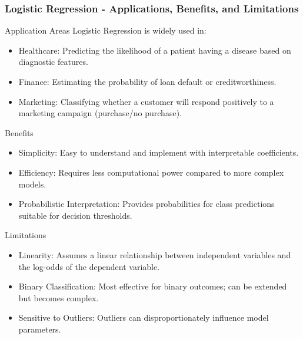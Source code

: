 \documentclass[aspectratio=169]{beamer}
\begin{document}
\begin{frame}[fragile]
    \frametitle{Logistic Regression - Applications, Benefits, and Limitations}
    \begin{block}{Application Areas}
        Logistic Regression is widely used in:
        \begin{itemize}
            \item Healthcare: Predicting the likelihood of a patient having a disease based on diagnostic features.
            \item Finance: Estimating the probability of loan default or creditworthiness.
            \item Marketing: Classifying whether a customer will respond positively to a marketing campaign (purchase/no purchase).
        \end{itemize}
    \end{block}

    \begin{block}{Benefits}
        \begin{itemize}
            \item Simplicity: Easy to understand and implement with interpretable coefficients.
            \item Efficiency: Requires less computational power compared to more complex models.
            \item Probabilistic Interpretation: Provides probabilities for class predictions suitable for decision thresholds.
        \end{itemize}
    \end{block}

    \begin{block}{Limitations}
        \begin{itemize}
            \item Linearity: Assumes a linear relationship between independent variables and the log-odds of the dependent variable.
            \item Binary Classification: Most effective for binary outcomes; can be extended but becomes complex.
            \item Sensitive to Outliers: Outliers can disproportionately influence model parameters.
        \end{itemize}
    \end{block}
\end{frame}
\end{document}
